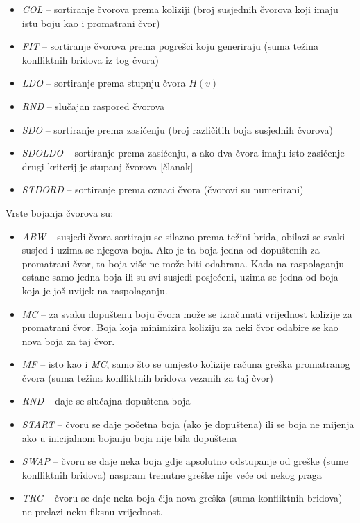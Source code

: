 \documentclass[times, utf8, diplomski, numeric]{fer}
\begin{document}
\begin{itemize}
	\item \emph{COL} -- sortiranje čvorova prema koliziji (broj susjednih čvorova koji imaju istu boju kao i promatrani čvor)
	\item \emph{FIT} -- sortiranje čvorova prema pogrešci koju generiraju (suma težina konfliktnih bridova iz tog čvora)
	\item \emph{LDO} -- sortiranje prema stupnju čvora $H(v)$
	\item \emph{RND} -- slučajan raspored čvorova
	\item \emph{SDO} -- sortiranje prema zasićenju (broj različitih boja susjednih čvorova)
	\item \emph{SDOLDO} -- sortiranje prema zasićenju, a ako dva čvora imaju isto zasićenje drugi kriterij je stupanj čvorova [članak]
	\item \emph{STDORD} -- sortiranje prema oznaci čvora (čvorovi su numerirani)
\end{itemize}

Vrste bojanja čvorova su:

\begin{itemize}
	\item \emph{ABW} -- susjedi čvora sortiraju se silazno prema težini brida, obilazi se svaki susjed i uzima se njegova boja. Ako je ta boja jedna od dopuštenih za promatrani čvor, ta boja više ne može biti odabrana. Kada na raspolaganju ostane samo jedna boja ili su svi susjedi posjećeni, uzima se jedna od boja koja je još uvijek na raspolaganju. 
	\item \emph{MC} -- za svaku dopuštenu boju čvora može se izračunati vrijednost kolizije za promatrani čvor. Boja koja minimizira koliziju za neki čvor odabire se kao nova boja za taj čvor.
	\item \emph{MF} -- isto kao i \emph{MC}, samo što se umjesto kolizije računa greška promatranog čvora (suma težina konfliktnih bridova vezanih za taj čvor)
	\item \emph{RND} -- daje se slučajna dopuštena boja
	\item \emph{START} -- čvoru se daje početna boja (ako je dopuštena) ili se boja ne mijenja ako u inicijalnom bojanju boja nije bila dopuštena
	\item \emph{SWAP} -- čvoru se daje neka boja gdje apsolutno odstupanje od greške (sume konfliktnih bridova) naspram trenutne greške nije veće od nekog praga
	\item \emph{TRG} -- čvoru se daje neka boja čija nova greška (suma konfliktnih bridova) ne prelazi neku fiksnu vrijednost. 
\end{itemize}
\end{document}
